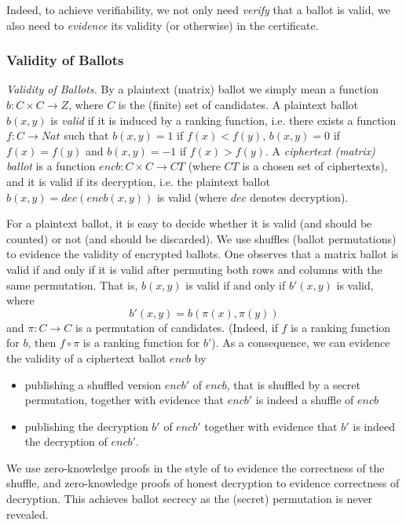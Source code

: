 \noindent
Indeed, to achieve verifiability, we not only need \emph{verify}
that a ballot is valid, we also need to \emph{evidence} its validity
(or otherwise) in the certificate. 

 
 \subsubsection{Validity of Ballots}
 \smallskip\noindent\emph{Validity of Ballots.} By a plaintext
(matrix) ballot
we simply mean a function $b: C \times C \to Z$,
where $C$ is the (finite) set of candidates. A 
plaintext ballot $b(x, y)$ 
is \emph{valid} if it is induced by a ranking function, i.e.
there exists a function $f: C \to Nat$ such that $b(x, y) = 1$ if
$f(x) < f(y)$, $b(x, y) = 0$ if $f(x) = f(y)$ and $b(x, y) = -1$ if
$f(x) > f(y)$. A \emph{ciphertext (matrix) ballot} is a function
$encb: C \times C \to CT$ (where $CT$ is a chosen set of
ciphertexts), and it is valid if its decryption,  i.e. the plaintext
ballot $b(x, y)  = dec(encb(x, y))$ is valid (where $dec$ denotes
decryption).

For a plaintext ballot, it is easy to decide whether it is
valid (and should be counted) or not (and should be discarded). We
use shuffles (ballot permutations) to evidence the validity of
encrypted ballots. One observes that a matrix ballot is valid if and
only if it is valid after permuting both rows and columns with the
same permutation. That is, $b(x,y)$ is valid if and only if $b'(x,y)$
is valid, where
\[ b'(x,y) = b(\pi(x), \pi(y)) \]
and $\pi: C \to C$ is a permutation of candidates. (Indeed, if $f$
is a ranking function for $b$, then $f \circ \pi$ is a ranking
function for $b'$). As a consequence, we can evidence the validity
of a ciphertext ballot $encb$ by
\begin{itemize}
  \item publishing a shuffled version $encb'$ of $encb$, that is
  shuffled by a secret permutation, together with
  evidence that $encb'$ is indeed a shuffle of $encb$
  \item publishing the decryption $b'$ of $encb'$ together with
  evidence that $b'$ is indeed the decryption of $encb'$.
\end{itemize}

We use zero-knowledge proofs in the style of \cite{DBLP:conf/africacrypt/TereliusW10}
to evidence the correctness of the shuffle, and zero-knowledge
proofs of honest decryption \cite{DBLP:conf/crypto/ChaumP92} to evidence
correctness of decryption. This achieves ballot secrecy as
the (secret) permutation is never revealed.

